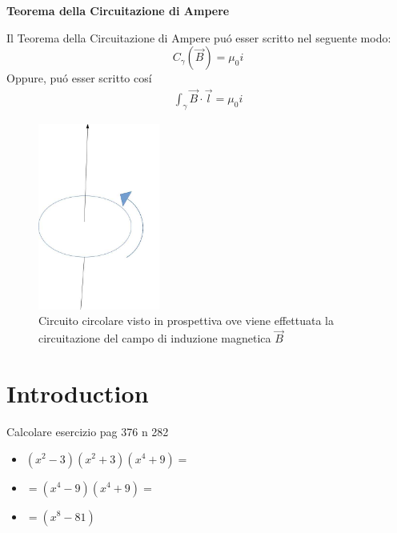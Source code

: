 \documentclass[12pt]{article}
\begin{document}
\begin{center}
	{\bf Teorema della Circuitazione di Ampere}
\end{center}

Il Teorema della Circuitazione di Ampere pu\'o esser scritto nel seguente modo:
\begin{equation}
	C_{\gamma}(\vec{B}) = \mu_0 i
\end{equation}
Oppure, pu\'o esser scritto cos\'i
\begin{eqnarray}
	\int_{\gamma}\vec{B}\cdot\vec{l} = \mu_0 i
\end{eqnarray}

\begin{figure}[h]
	\begin{center}
		\includegraphics[width=4cm]{campoB.jpg}
		\caption{Circuito circolare visto in prospettiva ove viene effettuata la circuitazione del campo di induzione magnetica $\vec{B}$}
	\end{center}
\end{figure}

\section{Introduction}

Calcolare esercizio pag 376 n 282

\begin{itemize}
	\item $\left(x^2-3\right)\left(x^2+3\right)\left(x^4+9\right) =$ \\
	\item $= \left(x^4-9\right)\left(x^4+9\right) = $
	\item $= \left(x^8-81\right) $
\end{itemize}
\end{document}
